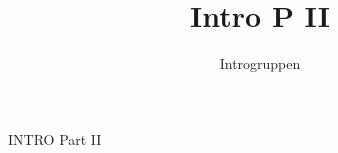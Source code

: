 \documentclass[a4paper]{article}
\title{Intro P II}
\author{Introgruppen}
\begin{document}
\maketitle

\begin{sketch}
  \begin{center}\begin{Huge}
      \vspace{7cm}
      INTRO Part II
    \end{Huge}\end{center}

\end{sketch}
\end{document}
